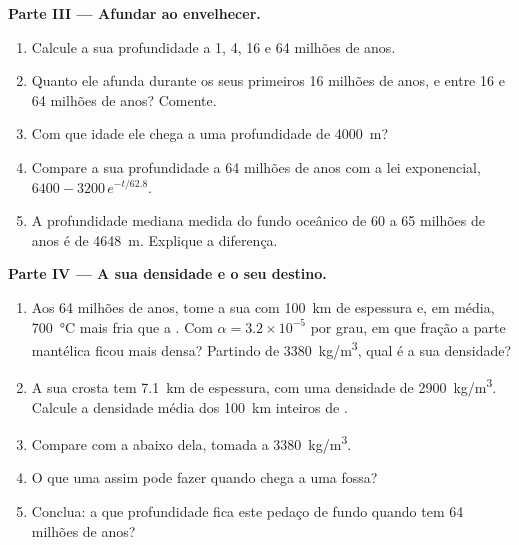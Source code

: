 \begin{problem}
\medskip
\noindent\textbf{Parte III --- Afundar ao envelhecer.}
\begin{enumerate}[resume]
  \item Calcule a sua profundidade a 1, 4, 16 e 64 milhões de anos.
  \item Quanto ele afunda durante os seus primeiros 16 milhões de anos, e
        entre 16 e 64 milhões de anos? Comente.
  \item Com que idade ele chega a uma profundidade de \qty{4000}{m}?
  \item Compare a sua profundidade a 64 milhões de anos com a lei
        exponencial, $6400 - 3200\,e^{-t/62.8}$.
  \item A profundidade mediana medida do fundo oceânico de 60 a 65 milhões
        de anos é de \qty{4648}{m}. Explique a diferença.
\end{enumerate}

\medskip
\noindent\textbf{Parte IV --- A sua densidade e o seu destino.}
\begin{enumerate}[resume]
  \item Aos 64 milhões de anos, tome a sua  com \qty{100}{km} de
        espessura e, em média, \qty{700}{\celsius} mais fria que a
        . Com $\alpha = 3.2 \times 10^{-5}$ por grau, em que
        fração a parte mantélica ficou mais densa? Partindo de
        \qty{3380}{kg/m^3}, qual é a sua densidade?
  \item A sua crosta tem \qty{7.1}{km} de espessura, com uma densidade de
        \qty{2900}{kg/m^3}. Calcule a densidade média dos
        \qty{100}{km} inteiros de .
  \item Compare com a  abaixo dela, tomada a
        \qty{3380}{kg/m^3}.
  \item O que uma  assim pode fazer quando chega a uma fossa?
  \item Conclua: a que profundidade fica este pedaço de fundo quando tem 64
        milhões de anos?
\end{enumerate}
\end{problem}

